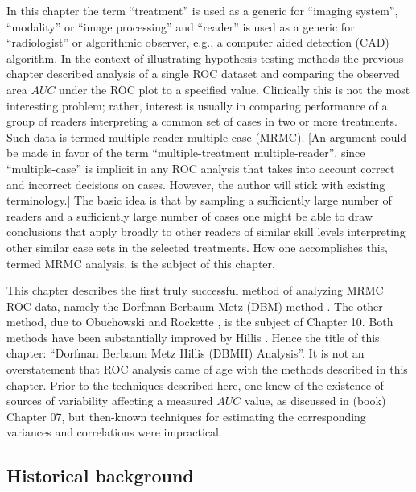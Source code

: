 \documentclass[
]{book}
\begin{document}
In this chapter the term ``treatment'' is used as a generic for ``imaging system'', ``modality'' or ``image processing'' and ``reader'' is used as a generic for ``radiologist'' or algorithmic observer, e.g., a computer aided detection (CAD) algorithm. In the context of illustrating hypothesis-testing methods the previous chapter described analysis of a single ROC dataset and comparing the observed area \(AUC\) under the ROC plot to a specified value. Clinically this is not the most interesting problem; rather, interest is usually in comparing performance of a group of readers interpreting a common set of cases in two or more treatments. Such data is termed multiple reader multiple case (MRMC). {[}An argument could be made in favor of the term ``multiple-treatment multiple-reader'', since ``multiple-case'' is implicit in any ROC analysis that takes into account correct and incorrect decisions on cases. However, the author will stick with existing terminology.{]} The basic idea is that by sampling a sufficiently large number of readers and a sufficiently large number of cases one might be able to draw conclusions that apply broadly to other readers of similar skill levels interpreting other similar case sets in the selected treatments. How one accomplishes this, termed MRMC analysis, is the subject of this chapter.

This chapter describes the first truly successful method of analyzing MRMC ROC data, namely the Dorfman-Berbaum-Metz (DBM) method \citep{RN204}. The other method, due to Obuchowski and Rockette \citep{RN1450}, is the subject of Chapter 10. Both methods have been substantially improved by Hillis \citep{RN1866, RN1865, RN2508}. Hence the title of this chapter: ``Dorfman Berbaum Metz Hillis (DBMH) Analysis''. It is not an overstatement that ROC analysis came of age with the methods described in this chapter. Prior to the techniques described here, one knew of the existence of sources of variability affecting a measured \(AUC\) value, as discussed in (book) Chapter 07, but then-known techniques \citep{RN412} for estimating the corresponding variances and correlations were impractical.

\hypertarget{historical-background}{%
\subsection{Historical background}\label{historical-background}}
\end{document}
